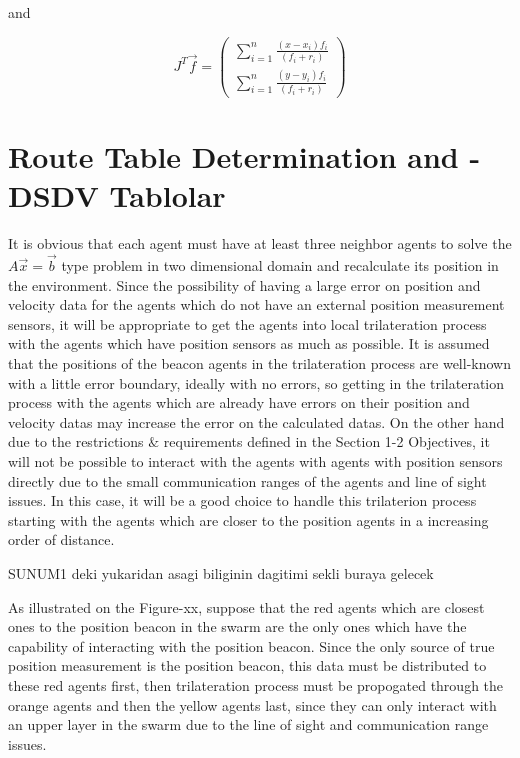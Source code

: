 \documentclass[twoside]{article}
\begin{document}
and 

\begin{equation}
  J^T\vec{f} = \left(\begin{matrix}
 \sum_{i=1}^{n}\frac{(x-x_i)f_i}{(f_i+r_i)} \\
  \sum_{i=1}^{n}\frac{(y-y_i)f_i}{(f_i+r_i)}
  \end{matrix}\right)
\end{equation}
	
	
	\section{ Route Table Determination and - DSDV Tablolar}
	
	It is obvious that each agent must have at least three neighbor agents to solve the $A\vec{x}=\vec{b}$ type problem in two dimensional domain and recalculate its position in the environment. Since the possibility of having a large error on position and velocity data for the agents which do not have an external position measurement sensors, it will be appropriate to get the agents into local trilateration process with the agents which have position sensors as much as possible. It is assumed that the positions of the beacon agents in the trilateration process are well-known with a little error boundary, ideally with no errors, so getting in the trilateration process with the agents which are already have errors on their position and velocity datas may increase the error on the calculated datas. On the other hand due to the restrictions $\&$ requirements defined in the Section 1-2 Objectives, it will not be possible to interact with the agents with agents with position sensors directly due to the small communication ranges of the agents and line of sight issues. In this case, it will be a good choice to handle this trilaterion process starting with the agents which are closer to the position agents in a increasing order of distance. 
	
	SUNUM1 deki yukaridan asagi biliginin dagitimi sekli buraya gelecek
	
	As illustrated on the Figure-xx, suppose that the red agents which are closest ones to the position beacon in the swarm are the only ones which have the capability of interacting with the position beacon. Since the only source of true position measurement is the position beacon, this data must be distributed to these red agents first, then trilateration process must be propogated through the orange agents and then the yellow agents last, since they can only interact with an upper layer in the swarm due to the line of sight and communication range issues.
	
\end{document}
